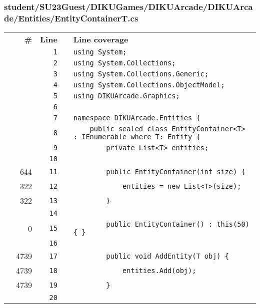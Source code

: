 \documentclass[a4paper,landscape,10pt]{article}
\begin{document}
\subsubsection{student/SU23Guest/DIKUGames/DIKUArcade/DIKUArcade/Entities/EntityContainerT.cs}
\begin{longtable}[l]{lrrll}
\textbf{} & \textbf{\#} & \textbf{Line} & \textbf{} & \textbf{Line coverage}\\
\cellcolor{gray} &  & \verb~1~ & & \verb~using System;~\\
\cellcolor{gray} &  & \verb~2~ & & \verb~using System.Collections;~\\
\cellcolor{gray} &  & \verb~3~ & & \verb~using System.Collections.Generic;~\\
\cellcolor{gray} &  & \verb~4~ & & \verb~using System.Collections.ObjectModel;~\\
\cellcolor{gray} &  & \verb~5~ & & \verb~using DIKUArcade.Graphics;~\\
\cellcolor{gray} &  & \verb~6~ & & \verb~~\\
\cellcolor{gray} &  & \verb~7~ & & \verb~namespace DIKUArcade.Entities {~\\
\cellcolor{gray} &  & \verb~8~ & & \verb~    public sealed class EntityContainer<T> : IEnumerable where T: Entity {~\\
\cellcolor{gray} &  & \verb~9~ & & \verb~        private List<T> entities;~\\
\cellcolor{gray} &  & \verb~10~ & & \verb~~\\
\cellcolor{green} & 644 & \verb~11~ & & \verb~        public EntityContainer(int size) {~\\
\cellcolor{green} & 322 & \verb~12~ & & \verb~            entities = new List<T>(size);~\\
\cellcolor{green} & 322 & \verb~13~ & & \verb~        }~\\
\cellcolor{gray} &  & \verb~14~ & & \verb~~\\
\cellcolor{red} & 0 & \verb~15~ & & \verb~        public EntityContainer() : this(50) { }~\\
\cellcolor{gray} &  & \verb~16~ & & \verb~~\\
\cellcolor{green} & 4739 & \verb~17~ & & \verb~        public void AddEntity(T obj) {~\\
\cellcolor{green} & 4739 & \verb~18~ & & \verb~            entities.Add(obj);~\\
\cellcolor{green} & 4739 & \verb~19~ & & \verb~        }~\\
\cellcolor{gray} &  & \verb~20~ & & \verb~~\\

\end{longtable}
\end{document}
